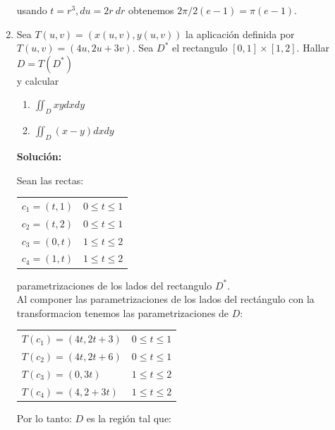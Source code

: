 \documentclass[10pt,letterpaper,fleqn]{article}
\begin{document}
\begin{enumerate}
        	  usando $t = r^3, du = 2r\ dr$
        	  obtenemos $2\pi/2(e-1) = \pi(e-1).$
        
        \item Sea $T(u,v) = (x(u,v),y(u,v))$ la aplicación definida por $T(u,v) = (4u,2u+3v)$. Sea $D^*$ el rectangulo $[0,1] \times [1,2]$. Hallar $D=T(D^*)$ \\ y calcular 

            \begin{enumerate}
                \item $\iint_D{xy}dxdy$
                \item $\iint_D{(x-y)}dxdy$
            \end{enumerate}

            \textbf{Solución:}

            Sean las rectas:

            \begin{tabular}{ll}
                $c_1 = (t,1)$ & $0 \leq t \leq 1$ \\
                $c_2 = (t,2)$ & $0 \leq t \leq 1$ \\
                $c_3 = (0,t)$ & $1 \leq t \leq 2$ \\
                $c_4 = (1,t)$ & $1 \leq t \leq 2$ \\
            \end{tabular}

            parametrizaciones de los lados del rectangulo $D^*$. \\
            Al componer las parametrizaciones de los lados del rectángulo con la transformacion tenemos las parametrizaciones de $D$:

            \begin{minipage}[b]{0.5\textwidth}
                \begin{tabular}{ll}
                    $T(c_1) = (4t,2t + 3)$ & $0 \leq t \leq 1$ \\
                    $T(c_2) = (4t,2t + 6)$ & $0 \leq t \leq 1$ \\
                    $T(c_3) = (0,3t)$ & $1 \leq t \leq 2$ \\
                    $T(c_4) = (4,2 + 3t)$ & $1 \leq t \leq 2$ \\
                \end{tabular}

                \vspace{0.3cm}
                Por lo tanto: $D$ es la región tal que: 


\end{minipage}
\end{enumerate}
\end{document}
